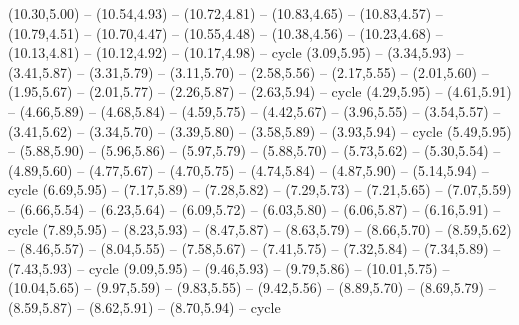 \expandafter\def\csname geo:Tissot:k24\endcsname{
  (10.30,5.00) -- (10.54,4.93) -- (10.72,4.81) -- (10.83,4.65) -- (10.83,4.57) -- (10.79,4.51) -- (10.70,4.47) -- (10.55,4.48) -- (10.38,4.56) -- (10.23,4.68) -- (10.13,4.81) -- (10.12,4.92) -- (10.17,4.98) -- cycle}
\expandafter\def\csname geo:Tissot:k25\endcsname{
  (3.09,5.95) -- (3.34,5.93) -- (3.41,5.87) -- (3.31,5.79) -- (3.11,5.70) -- (2.58,5.56) -- (2.17,5.55) -- (2.01,5.60) -- (1.95,5.67) -- (2.01,5.77) -- (2.26,5.87) -- (2.63,5.94) -- cycle}
\expandafter\def\csname geo:Tissot:k26\endcsname{
  (4.29,5.95) -- (4.61,5.91) -- (4.66,5.89) -- (4.68,5.84) -- (4.59,5.75) -- (4.42,5.67) -- (3.96,5.55) -- (3.54,5.57) -- (3.41,5.62) -- (3.34,5.70) -- (3.39,5.80) -- (3.58,5.89) -- (3.93,5.94) -- cycle}
\expandafter\def\csname geo:Tissot:k27\endcsname{
  (5.49,5.95) -- (5.88,5.90) -- (5.96,5.86) -- (5.97,5.79) -- (5.88,5.70) -- (5.73,5.62) -- (5.30,5.54) -- (4.89,5.60) -- (4.77,5.67) -- (4.70,5.75) -- (4.74,5.84) -- (4.87,5.90) -- (5.14,5.94) -- cycle}
\expandafter\def\csname geo:Tissot:k28\endcsname{
  (6.69,5.95) -- (7.17,5.89) -- (7.28,5.82) -- (7.29,5.73) -- (7.21,5.65) -- (7.07,5.59) -- (6.66,5.54) -- (6.23,5.64) -- (6.09,5.72) -- (6.03,5.80) -- (6.06,5.87) -- (6.16,5.91) -- cycle}
\expandafter\def\csname geo:Tissot:k29\endcsname{
  (7.89,5.95) -- (8.23,5.93) -- (8.47,5.87) -- (8.63,5.79) -- (8.66,5.70) -- (8.59,5.62) -- (8.46,5.57) -- (8.04,5.55) -- (7.58,5.67) -- (7.41,5.75) -- (7.32,5.84) -- (7.34,5.89) -- (7.43,5.93) -- cycle}
\expandafter\def\csname geo:Tissot:k30\endcsname{
  (9.09,5.95) -- (9.46,5.93) -- (9.79,5.86) -- (10.01,5.75) -- (10.04,5.65) -- (9.97,5.59) -- (9.83,5.55) -- (9.42,5.56) -- (8.89,5.70) -- (8.69,5.79) -- (8.59,5.87) -- (8.62,5.91) -- (8.70,5.94) -- cycle}


